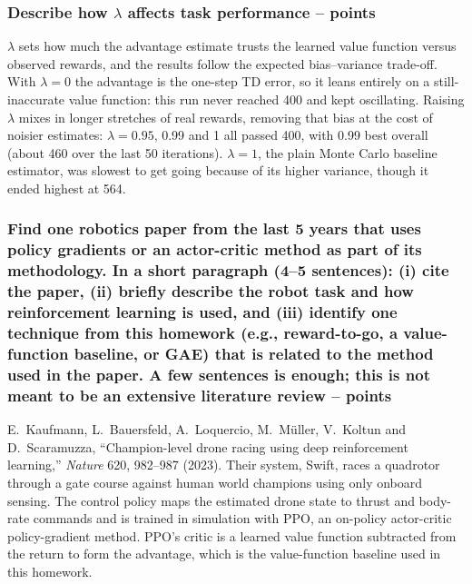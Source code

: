 \documentclass{article}
\begin{document}
\subsubsection{Describe how $\lambda$ affects task performance --  points\rbrack}
\begin{answer}[title=Q8.1.3,height=4cm,width=\linewidth]
$\lambda$ sets how much the advantage estimate trusts the learned value function versus observed rewards, and the results follow the expected bias--variance trade-off. With $\lambda=0$ the advantage is the one-step TD error, so it leans entirely on a still-inaccurate value function: this run never reached 400 and kept oscillating. Raising $\lambda$ mixes in longer stretches of real rewards, removing that bias at the cost of noisier estimates: $\lambda=0.95$, 0.99 and 1 all passed 400, with 0.99 best overall (about 460 over the last 50 iterations). $\lambda=1$, the plain Monte Carlo baseline estimator, was slowest to get going because of its higher variance, though it ended highest at 564.
\end{answer}

\subsubsection{Find one robotics paper from the last 5 years that uses policy gradients or an actor-critic method as part of its methodology. 
    In a short paragraph (4--5 sentences): (i) cite the paper, (ii) briefly describe the robot task and how reinforcement learning is used, and (iii) identify one technique from this homework (e.g., reward-to-go, a value-function baseline, or GAE) that is related to the method used in the paper. A few sentences is enough; this is not meant to be an extensive literature review  --  points\rbrack
}
\begin{answer}[title=Q8.1.4,height=4cm,width=\linewidth]
E.~Kaufmann, L.~Bauersfeld, A.~Loquercio, M.~M\"uller, V.~Koltun and D.~Scaramuzza, ``Champion-level drone racing using deep reinforcement learning,'' \emph{Nature} 620, 982--987 (2023). Their system, Swift, races a quadrotor through a gate course against human world champions using only onboard sensing. The control policy maps the estimated drone state to thrust and body-rate commands and is trained in simulation with PPO, an on-policy actor-critic policy-gradient method. PPO's critic is a learned value function subtracted from the return to form the advantage, which is the value-function baseline used in this homework.
\end{answer}
\end{document}
